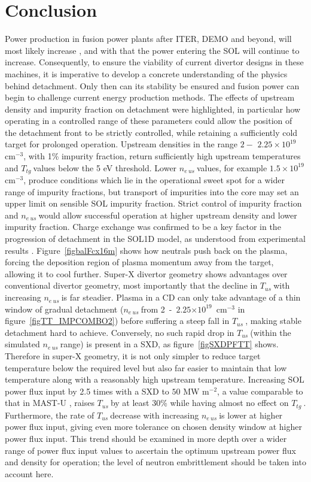 \documentclass[12pt]{article}  %
\providecommand{\e}[1]{\ensuremath{\times 10^{#1}}} %
\providecommand{\noNe}[1]{{${#1}\times 10^{19}$ cm$^{-3}$}} %
\providecommand{\pow}[1]{{$^{#1}$}} %
\providecommand{\neus}{$n_{e~us}~$} %
\providecommand{\Tus}{$T_{us}~$} %
\providecommand{\Ttg}{$T_{tg}~$} %
\begin{document}
\section{Conclusion}\label{secConclusion}
Power production in fusion power plants after ITER, DEMO and beyond, will most likely increase \cite{Federici2014}, and with that the power entering the SOL will continue to increase. Consequently, to ensure the viability of current divertor designs in these machines, it is imperative to develop a concrete understanding of the physics behind detachment. Only then can its stability be ensured and fusion power can begin to challenge current energy production methods. The effects of upstream density and impurity fraction on detachment were highlighted, in particular how operating in a controlled range of these parameters could allow the position of the detachment front to be strictly controlled, while retaining a sufficiently cold target for prolonged operation. Upstream densities in the range $2 -$ \noNe{2.25}, with 1\% impurity fraction, return sufficiently high upstream temperatures and \Ttg values below the 5 eV threshold. Lower \neus values, for example \noNe{1.5}, produce conditions which lie in the operational sweet spot for a wider range of impurity fractions, but transport of impurities into the core may set an upper limit on sensible SOL impurity fraction. Strict control of impurity fraction and \neus would allow successful operation at higher upstream density and lower impurity fraction. Charge exchange was confirmed to be a key factor in the progression of detachment in the SOL1D model, as understood from experimental results \cite{Loarte1998, Wischmeier2009}. Figure~\ref{figbalFcx16m} shows how neutrals push back on the plasma, forcing the deposition region of plasma momentum away from the target, allowing it to cool further. Super-X divertor geometry shows advantages over conventional divertor geometry, most importantly that the decline in \Tus with increasing \neus is far steadier. Plasma in a CD can only take advantage of a thin window of gradual detachment (\neus from 2~-~$2.25\e{19}$~cm\pow{-3} in figure~\ref{figTT_IMPCOMBO2}) before suffering a steep fall in \Tus, making stable detachment hard to achieve. Conversely, no such rapid drop in \Tus (within the simulated \neus range) is present in a SXD, as figure~\ref{figSXDPFTT} shows. Therefore in super-X geometry, it is not only simpler to reduce target temperature below the required level but also far easier to maintain that low temperature along with a reasonably high upstream temperature. Increasing SOL power flux input by 2.5 times with a SXD to $50$ MW m\pow{-2}, a value comparable to that in MAST-U \cite{Havlickova2014}, raises \Tus by at least 30\% while having almost no effect on \Ttg. Furthermore, the rate of \Tus decrease with increasing \neus is lower at higher power flux input, giving even more tolerance on chosen density window at higher power flux input. This trend should be examined in more depth over a wider range of power flux input values to ascertain the optimum upstream power flux and density for operation; the level of neutron embrittlement should be taken into account here.
\end{document}

